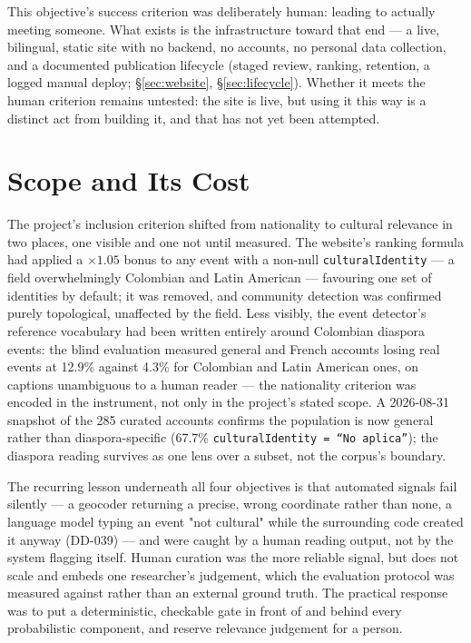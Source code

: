 \documentclass[12pt, a4paper]{report}
\begin{document}
This objective's success criterion was deliberately human: leading to
actually meeting someone. What exists is the infrastructure toward that
end — a live, bilingual, static site with no backend, no accounts, no
personal data collection, and a documented publication lifecycle (staged
review, ranking, retention, a logged manual deploy;
\S\ref{sec:website}, \S\ref{sec:lifecycle}). Whether it meets the human
criterion remains untested: the site is live, but using it this way is a
distinct act from building it, and that has not yet been attempted.

\section{Scope and Its Cost}
\label{sec:scope-evolution}

The project's inclusion criterion shifted from nationality to cultural
relevance in two places, one visible and one not until measured. The
website's ranking formula had applied a $\times 1.05$ bonus to any event
with a non-null \texttt{culturalIdentity} — a field overwhelmingly
Colombian and Latin American — favouring one set of identities by
default; it was removed, and community detection was confirmed purely
topological, unaffected by the field. Less visibly, the event
detector's reference vocabulary had been written entirely around
Colombian diaspora events: the blind evaluation measured general and
French accounts losing real events at 12.9\% against 4.3\% for Colombian
and Latin American ones, on captions unambiguous to a human reader — the
nationality criterion was encoded in the instrument, not only in the
project's stated scope. A 2026-08-31 snapshot of the 285 curated accounts
confirms the population is now general rather than diaspora-specific
(67.7\% \texttt{culturalIdentity = ``No aplica''}); the diaspora reading
survives as one lens over a subset, not the corpus's boundary.

The recurring lesson underneath all four objectives is that automated
signals fail silently — a geocoder returning a precise, wrong coordinate
rather than none, a language model typing an event "not cultural" while
the surrounding code created it anyway (DD-039) — and were caught by a
human reading output, not by the system flagging itself. Human curation
was the more reliable signal, but does not scale and embeds one
researcher's judgement, which the evaluation protocol was measured
against rather than an external ground truth. The practical response
was to put a deterministic, checkable gate in front of and behind every
probabilistic component, and reserve relevance judgement for a person.
\end{document}
